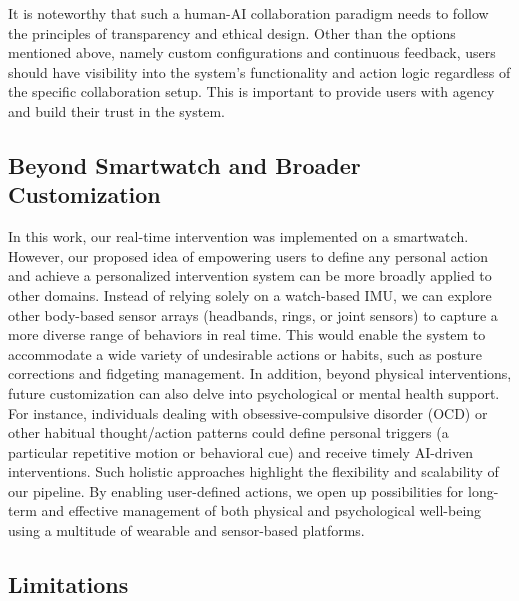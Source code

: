 It is noteworthy that such a human-AI collaboration paradigm needs to follow the principles of transparency and ethical design.
Other than the options mentioned above, namely custom configurations and continuous feedback, users should have visibility into the system's functionality and action logic regardless of the specific collaboration setup. This is important to provide users with agency and build their trust in the system.

\subsection{Beyond Smartwatch and Broader Customization}
In this work, our real-time intervention was implemented on a smartwatch. However, our proposed idea of empowering users to define any personal action and achieve a personalized intervention system can be more broadly applied to other domains.
Instead of relying solely on a watch-based IMU, we can explore other body-based sensor arrays (\eg headbands, rings, or joint sensors) to capture a more diverse range of behaviors in real time.
This would enable the system to accommodate a wide variety of undesirable actions or habits, such as posture corrections and fidgeting management.
In addition, beyond physical interventions, future customization can also delve into psychological or mental health support.
For instance, individuals dealing with obsessive-compulsive disorder (OCD) or other habitual thought/action patterns could define personal triggers (\eg a particular repetitive motion or behavioral cue) and receive timely AI-driven interventions.
Such holistic approaches highlight the flexibility and scalability of our pipeline.
By enabling user-defined actions, we open up possibilities for long-term and effective management of both physical and psychological well-being using a multitude of wearable and sensor-based platforms.

\subsection{Limitations}

